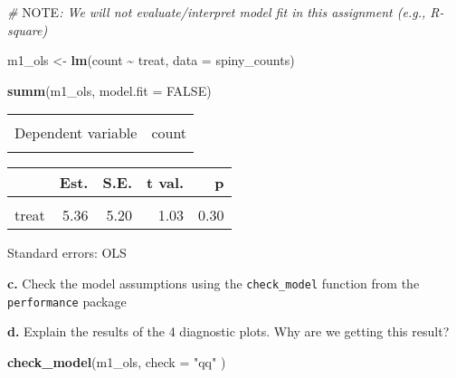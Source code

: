 \documentclass[
]{article}
\newenvironment{Shaded}{\begin{snugshade}}{\end{snugshade}}
\newcommand{\AlertTok}[1]{\textcolor[rgb]{0.94,0.16,0.16}{#1}}
\newcommand{\AttributeTok}[1]{\textcolor[rgb]{0.13,0.29,0.53}{#1}}
\newcommand{\CommentTok}[1]{\textcolor[rgb]{0.56,0.35,0.01}{\textit{#1}}}
\newcommand{\ConstantTok}[1]{\textcolor[rgb]{0.56,0.35,0.01}{#1}}
\newcommand{\FunctionTok}[1]{\textcolor[rgb]{0.13,0.29,0.53}{\textbf{#1}}}
\newcommand{\NormalTok}[1]{#1}
\newcommand{\OtherTok}[1]{\textcolor[rgb]{0.56,0.35,0.01}{#1}}
\newcommand{\SpecialCharTok}[1]{\textcolor[rgb]{0.81,0.36,0.00}{\textbf{#1}}}
\newcommand{\StringTok}[1]{\textcolor[rgb]{0.31,0.60,0.02}{#1}}
\begin{document}
\begin{Shaded}
\begin{Highlighting}[]
\CommentTok{\# }\AlertTok{NOTE}\CommentTok{: We will not evaluate/interpret model fit in this assignment (e.g., R{-}square)}

\NormalTok{m1\_ols }\OtherTok{\textless{}{-}} \FunctionTok{lm}\NormalTok{(count }\SpecialCharTok{\textasciitilde{}}\NormalTok{ treat,}
             \AttributeTok{data =}\NormalTok{ spiny\_counts)}

\FunctionTok{summ}\NormalTok{(m1\_ols, }\AttributeTok{model.fit =} \ConstantTok{FALSE}\NormalTok{) }
\end{Highlighting}
\end{Shaded}

\begin{table}[!h]
\centering
\begin{tabular}{lr}
\toprule
\cellcolor{gray!10}{Observations} & \cellcolor{gray!10}{252}\\
Dependent variable & count\\
\cellcolor{gray!10}{Type} & \cellcolor{gray!10}{OLS linear regression}\\
\bottomrule
\end{tabular}
\end{table}  \begin{table}[!h]
\centering
\begin{threeparttable}
\begin{tabular}{lrrrr}
\toprule
  & Est. & S.E. & t val. & p\\
\midrule
\cellcolor{gray!10}{(Intercept)} & \cellcolor{gray!10}{22.73} & \cellcolor{gray!10}{3.57} & \cellcolor{gray!10}{6.36} & \cellcolor{gray!10}{0.00}\\
treat & 5.36 & 5.20 & 1.03 & 0.30\\
\bottomrule
\end{tabular}
\begin{tablenotes}
\item Standard errors: OLS
\end{tablenotes}
\end{threeparttable}
\end{table}

\textbf{c.} Check the model assumptions using the \texttt{check\_model}
function from the \texttt{performance} package

\textbf{d.} Explain the results of the 4 diagnostic plots. Why are we
getting this result?

\begin{Shaded}
\begin{Highlighting}[]
\FunctionTok{check\_model}\NormalTok{(m1\_ols,  }\AttributeTok{check =} \StringTok{"qq"}\NormalTok{ )}
\end{Highlighting}
\end{Shaded}
\end{document}
